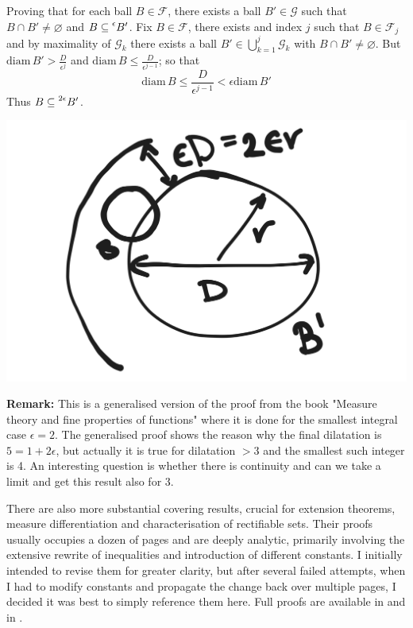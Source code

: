 \vspace{1ex}
Proving that for each ball $B\in\mathcal{F}$, there exists a ball $B'\in\mathcal{G}$
such that $B\cap B'\neq\varnothing$ and $B\subseteq\prescript{\epsilon}{}B'$. Fix
$B\in\mathcal{F}$, there exists and index $j$ such that $B\in\mathcal{F}_j$ and
by maximality of $\mathcal{G}_k$ there exists a ball $B'\in\bigcup_{k=1}^j
\mathcal{G}_k$ with $B\cap B'\neq\varnothing$. But $\text{diam}\,B'>\frac{D}{\epsilon^j}$
and $\text{diam}\,B\leq\frac{D}{\epsilon^{j-1}}$; so that
\[ \text{diam}\,B\leq \frac{D}{\epsilon^{j-1}} < \epsilon\text{diam}\,B'\]
Thus $B\subseteq\prescript{2\epsilon}{}B'$.
\begin{center}
    \includegraphics[scale=0.1]{Vitali.png}
\end{center}
\vspace{1ex}
\textbf{Remark:} This is a generalised version of the proof from the book
"Measure theory and fine properties of functions" where it is done for the
smallest integral case $\epsilon = 2$. The generalised proof shows the reason
why the final dilatation is $5 = 1+2\epsilon$, but actually it is true for
dilatation $>3$ and the smallest such integer is 4. An interesting question is
whether there is continuity and can we take a limit and get this result also
for 3.

\vspace{2ex}

There are also more substantial covering results, crucial for extension 
theorems, measure differentiation and characterisation of rectifiable sets.
Their proofs usually occupies a dozen of pages and are deeply analytic, primarily
involving the extensive rewrite of inequalities and introduction of different
constants. I initially intended to revise them for greater clarity, but after
several failed attempts, when I had to modify constants and propagate the change
back over multiple pages, I decided it was best to simply reference them here.
Full proofs are available in \cite{evans_gariepy} and in \cite{giovanni_alberti}.



